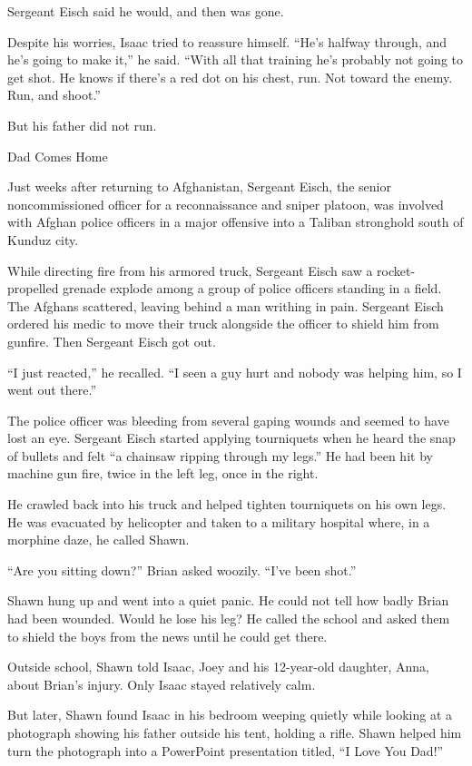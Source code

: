 ﻿\documentclass[12pt]{article}
\begin{document}
Sergeant Eisch said he would, and then was gone.

Despite his worries, Isaac tried to reassure himself. ``He's halfway through, and he's going to make
it,'' he said. ``With all that training he's probably not going to get shot. He knows if there's a
red dot on his chest, run. Not toward the enemy. Run, and shoot.''

But his father did not run.

Dad Comes Home

Just weeks after returning to Afghanistan, Sergeant Eisch, the senior noncommissioned officer for a
reconnaissance and sniper platoon, was involved with Afghan police officers in a major offensive
into a Taliban stronghold south of Kunduz city.

While directing fire from his armored truck, Sergeant Eisch saw a rocket-propelled grenade explode
among a group of police officers standing in a field. The Afghans scattered, leaving behind a man
writhing in pain. Sergeant Eisch ordered his medic to move their truck alongside the officer to
shield him from gunfire. Then Sergeant Eisch got out.

``I just reacted,'' he recalled. ``I seen a guy hurt and nobody was helping him, so I went out
there.''

The police officer was bleeding from several gaping wounds and seemed to have lost an eye. Sergeant
Eisch started applying tourniquets when he heard the snap of bullets and felt ``a chainsaw ripping
through my legs.'' He had been hit by machine gun fire, twice in the left leg, once in the right.

He crawled back into his truck and helped tighten tourniquets on his own legs. He was evacuated by
helicopter and taken to a military hospital where, in a morphine daze, he called Shawn.

``Are you sitting down?'' Brian asked woozily. ``I've been shot.''

Shawn hung up and went into a quiet panic. He could not tell how badly Brian had been wounded. Would
he lose his leg? He called the school and asked them to shield the boys from the news until he could
get there.

Outside school, Shawn told Isaac, Joey and his 12-year-old daughter, Anna, about Brian's injury.
Only Isaac stayed relatively calm.

But later, Shawn found Isaac in his bedroom weeping quietly while looking at a photograph showing
his father outside his tent, holding a rifle. Shawn helped him turn the photograph into a PowerPoint
presentation titled, ``I Love You Dad!''
\end{document}
